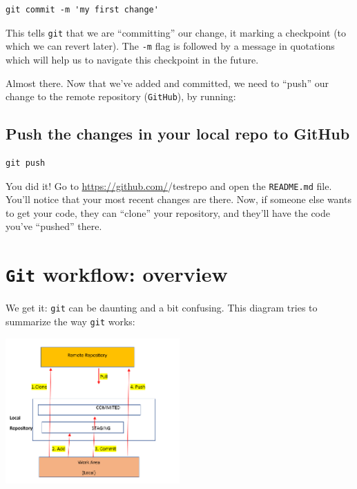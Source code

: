 \documentclass[
]{book}
\begin{document}
\begin{verbatim}
git commit -m 'my first change'
\end{verbatim}

This tells \texttt{git} that we are ``committing'' our change, it marking a checkpoint (to which we can revert later). The \texttt{-m} flag is followed by a message in quotations which will help us to navigate this checkpoint in the future.

Almost there. Now that we've added and committed, we need to ``push'' our change to the remote repository (\texttt{GitHub}), by running:

\hypertarget{push-the-changes-in-your-local-repo-to-github}{%
\subsection*{Push the changes in your local repo to GitHub}\label{push-the-changes-in-your-local-repo-to-github}}

\begin{verbatim}
git push
\end{verbatim}

You did it! Go to \url{https://github.com/}/testrepo and open the \texttt{README.md} file. You'll notice that your most recent changes are there. Now, if someone else wants to get your code, they can ``clone'' your repository, and they'll have the code you've ``pushed'' there.

\hypertarget{git-workflow-overview}{%
\section*{\texorpdfstring{\texttt{Git} workflow: overview}{Git workflow: overview}}\label{git-workflow-overview}}

We get it: \texttt{git} can be daunting and a bit confusing. This diagram tries to summarize the way \texttt{git} works:

\includegraphics[width=0.5\textwidth,height=\textheight]{img/git-workflow.png}
\end{document}
